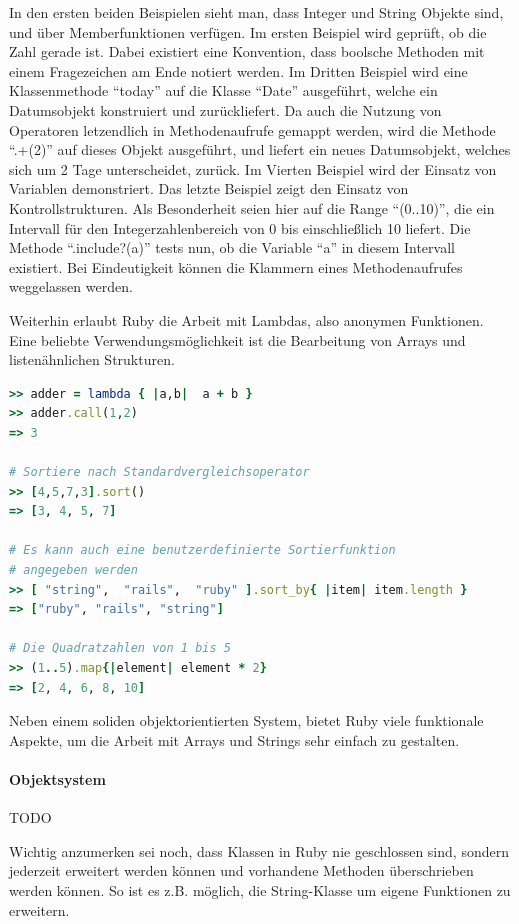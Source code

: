In den ersten beiden Beispielen sieht man, dass Integer und String Objekte sind, und über Memberfunktionen verfügen. Im ersten Beispiel wird geprüft, ob die Zahl gerade ist. Dabei existiert eine Konvention, dass boolsche Methoden mit einem Fragezeichen am Ende notiert werden. Im Dritten Beispiel wird eine Klassenmethode "`today"' auf die Klasse "`Date"' ausgeführt, welche ein Datumsobjekt konstruiert und zurückliefert. Da auch die Nutzung von Operatoren letzendlich in Methodenaufrufe gemappt werden, wird die Methode "`.+(2)"' auf dieses Objekt ausgeführt, und liefert ein neues Datumsobjekt, welches sich um 2 Tage unterscheidet, zurück.
Im Vierten Beispiel wird der Einsatz von Variablen demonstriert. 
Das letzte Beispiel zeigt den Einsatz von Kontrollstrukturen. Als Besonderheit seien hier auf die Range "`(0..10)"', die ein Intervall für den Integerzahlenbereich von 0 bis einschließlich 10 liefert. Die Methode "`.include?(a)"' tests nun, ob die Variable "`a"' in diesem Intervall existiert. Bei Eindeutigkeit können die Klammern eines Methodenaufrufes weggelassen werden.

Weiterhin erlaubt Ruby die Arbeit mit Lambdas, also anonymen Funktionen. Eine beliebte Verwendungsmöglichkeit ist die Bearbeitung von Arrays und listenähnlichen Strukturen.

\begin{lstlisting}[language=Ruby,label=Ruby Beispiel: Lambdas,caption=Ruby Beispiel: Lambdas]
>> adder = lambda { |a,b|  a + b }
>> adder.call(1,2)
=> 3

# Sortiere nach Standardvergleichsoperator
>> [4,5,7,3].sort()
=> [3, 4, 5, 7]

# Es kann auch eine benutzerdefinierte Sortierfunktion
# angegeben werden
>> [ "string",  "rails",  "ruby" ].sort_by{ |item| item.length }
=> ["ruby", "rails", "string"]

# Die Quadratzahlen von 1 bis 5
>> (1..5).map{|element| element * 2}
=> [2, 4, 6, 8, 10]
\end{lstlisting}
Neben einem soliden objektorientierten System, bietet Ruby viele funktionale Aspekte, um die Arbeit mit Arrays und Strings sehr einfach zu gestalten. 

\paragraph{Objektsystem}
TODO


Wichtig anzumerken sei noch, dass Klassen in Ruby nie geschlossen sind, sondern jederzeit erweitert werden können und vorhandene Methoden überschrieben werden können. So ist es z.B. möglich, die String-Klasse um eigene Funktionen zu erweitern.

